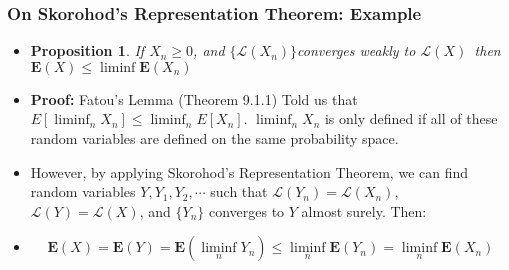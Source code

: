 \documentclass[handout]{beamer}
\newtheorem{Proposition}[theorem]{Proposition}%
\newcommand{\BE}{\mathbf{E}}
\begin{document}
\frame
{
  \frametitle{On Skorohod's Representation Theorem: Example} 

\begin{itemize}
              
\item<1->[] \begin{Proposition} If $X_n\geq 0$, and $\{ \mathcal{L} (X_n) \}$converges weakly to $\mathcal{L} (X)$\, then $\BE(X) \leq \liminf \BE(X_n)$ \end{Proposition}          
                    
\item<2-> \textbf{Proof:} Fatou's Lemma (Theorem 9.1.1) Told us that $E[\liminf_n X_n] \le \liminf_n E[X_n]$. $\liminf_n X_n$ is only defined if all of these random variables are defined on the same probability space. 

\item<3-> However, by applying  Skorohod's Representation Theorem, we can find random variables $Y, Y_1, Y_2, \cdots$ such that $\mathcal{L} (Y_n) =\mathcal{L} (X_n)$, $\mathcal{L} (Y) =\mathcal{L} (X)$, and $\{Y_n\}$ converges to $Y$ almost surely. Then: 
                   
\item<4->[]  $$\BE(X)=\BE(Y)=\BE(\liminf_n Y_n) \leq \liminf_n \BE(Y_n) =\liminf_n \BE(X_n)$$ 

\end{itemize}
}
\end{document}
